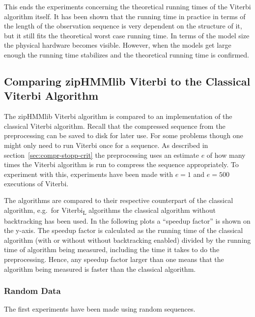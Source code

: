 This ends the experiments concerning the theoretical running times of the
Viterbi algorithm itself. It has been shown that the running time in practice
in terms of the length of the observation sequence is very dependent on the
structure of it, but it still fits the theoretical worst case running time. In
terms of the model size the physical hardware becomes visible. However, when
the models get large enough the running time stabilizes and the theoretical
running time is confirmed. 

\subsection{Comparing zipHMMlib Viterbi to the Classical Viterbi Algorithm}
\label{sec:comp-ziphmml-viterbi}

The zipHMMlib Viterbi algorithm is compared to an implementation of the
classical Viterbi algorithm. Recall that the compressed sequence from the
preprocessing can be saved to disk for later use. For some problems though one
might only need to run Viterbi once for a sequence. As described in
section~\ref{sec:compr-stopp-crit} the preprocessing uses an estimate $e$ of
how many times the Viterbi algorithm is run to compress the sequence
appropriately.  To experiment with this, experiments have been made with
$e = 1$ and $e = 500$ executions of Viterbi.

The algorithms are compared to their respective counterpart of the classical
algorithm, e.g.\ for Viterbi\textsubscript{L} algorithms the classical
algorithm without backtracking has been used. In the following plots a
``speedup factor'' is shown on the y-axis. The speedup factor is calculated as
the running time of the classical algorithm (with or without without backtracking
enabled) divided by the running time of algorithm being measured, including the
time it takes to do the preprocessing. Hence, any speedup factor larger than one
means that the algorithm being measured is faster than the classical algorithm.

\subsubsection{Random Data}

The first experiments have been made using random sequences.

